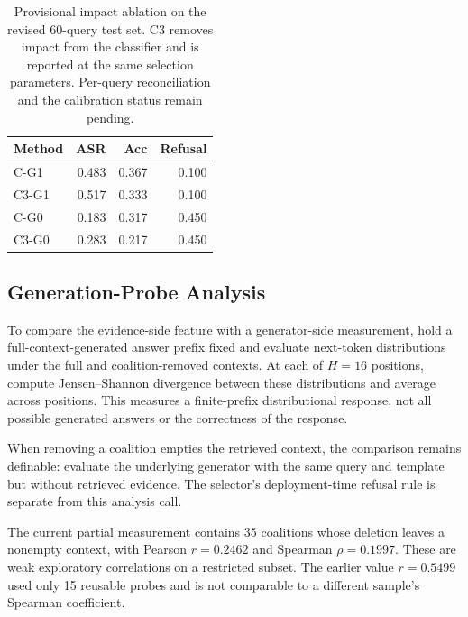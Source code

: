 \documentclass[sigconf]{acmart}
\newif\ifrevisionnotes
\newcommand{\verification}[1]{%
  \ifrevisionnotes
    \par\smallskip\noindent
    {\small\color{red!65!black}\textbf{Verification pending.} #1}\par\smallskip
  \fi}
\begin{document}
\begin{table}[t]
  \caption{Provisional impact ablation on the revised 60-query test set. C3 removes impact from the classifier and is reported at the same selection parameters. Per-query reconciliation and the calibration status remain pending.}
  \label{tab:impact}
  \centering
  \small
  \setlength{\tabcolsep}{4pt}
  \begin{tabular}{lrrr}
    \toprule
    Method & ASR & Acc & Refusal \\
    \midrule
    C-G1 & 0.483 & 0.367 & 0.100 \\
    C3-G1 & 0.517 & 0.333 & 0.100 \\
    C-G0 & 0.183 & 0.317 & 0.450 \\
    C3-G0 & 0.283 & 0.217 & 0.450 \\
    \bottomrule
  \end{tabular}
\end{table}

\verification{Rebuild separate G0 and G1 state-transition tables from the raw outputs. The report states that six queries change retained sets in each condition, while G0 ASR differs by six queries; the transition counts must reconcile with this boundary. Confirm retraining and distinguish fixed-parameter ablation from independently validation-calibrated ablation. Do not reuse the old 1.36/1.53/1.81 attribution ratios without verifying compatibility with the repaired impact and current coalitions.}

\subsection{Generation-Probe Analysis}

To compare the evidence-side feature with a generator-side measurement, hold a full-context-generated answer prefix fixed and evaluate next-token distributions under the full and coalition-removed contexts. At each of $H=16$ positions, compute Jensen--Shannon divergence between these distributions and average across positions. This measures a finite-prefix distributional response, not all possible generated answers or the correctness of the response.

When removing a coalition empties the retrieved context, the comparison remains definable: evaluate the underlying generator with the same query and template but without retrieved evidence. The selector's deployment-time refusal rule is separate from this analysis call.

The current partial measurement contains 35 coalitions whose deletion leaves a nonempty context, with Pearson $r=0.2462$ and Spearman $\rho=0.1997$. These are weak exploratory correlations on a restricted subset. The earlier value $r=0.5499$ used only 15 reusable probes and is not comparable to a different sample's Spearman coefficient.
\end{document}
